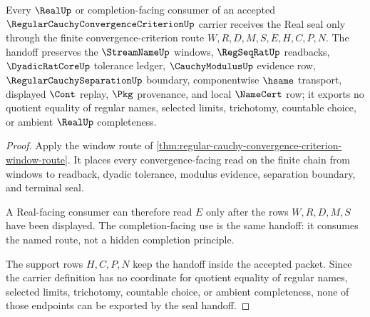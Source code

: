\begin{theorem}
\label{thm:regular-cauchy-convergence-criterion-real-seal-handoff}
Every $\RealUp$ or completion-facing consumer of an accepted $\RegularCauchyConvergenceCriterionUp$ carrier receives the Real seal only through the finite convergence-criterion route $W,R,D,M,S,E,H,C,P,N$. The handoff preserves the $\StreamNameUp$ windows, $\RegSeqRatUp$ readbacks, $\DyadicRatCoreUp$ tolerance ledger, $\CauchyModulusUp$ evidence row, $\RegularCauchySeparationUp$ boundary, componentwise $\hsame$ transport, displayed $\Cont$ replay, $\Pkg$ provenance, and local $\NameCert$ row; it exports no quotient equality of regular names, selected limits, trichotomy, countable choice, or ambient $\RealUp$ completeness.
\end{theorem}
\begin{proof}
Apply the window route of \autoref{thm:regular-cauchy-convergence-criterion-window-route}. It places every convergence-facing read on the finite chain from windows to readback, dyadic tolerance, modulus evidence, separation boundary, and terminal seal.

A Real-facing consumer can therefore read $E$ only after the rows $W,R,D,M,S$ have been displayed. The completion-facing use is the same handoff: it consumes the named route, not a hidden completion principle.

The support rows $H,C,P,N$ keep the handoff inside the accepted packet. Since the carrier definition has no coordinate for quotient equality of regular names, selected limits, trichotomy, countable choice, or ambient completeness, none of those endpoints can be exported by the seal handoff.
\end{proof}



